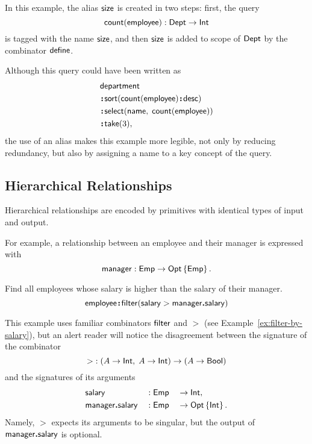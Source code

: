 In this example, the alias $\textup{\textsf{size}}$ is created in two steps: first, the query
\begin{equation*}
    \textup{\textsf{count}}(\textup{\textsf{employee}}): \textup{\textsf{Dept}} \to \textup{\textsf{Int}}
\end{equation*}
is tagged with the name $\textup{\textsf{size}}$, and then $\textup{\textsf{size}}$ is added to scope of $\textup{\textsf{Dept}}$
by the combinator $\textup{\textsf{define}}$.

Although this query could have been written as
\begin{align*}
    & \Department \\
    & \Apply\Sort(\Count(\Employee)\Apply\Desc) \\
    & \Apply\Select(\Name,\; \Count(\Employee)) \\
    & \Apply\Take(3),
\end{align*}
the use of an alias makes this example more legible, not only by reducing
redundancy, but also by assigning a name to a key concept of the query.

\subsection*{Hierarchical Relationships}

Hierarchical relationships are encoded by primitives with identical types of
input and output.

For example, a relationship between an employee and their manager is expressed
with
\begin{equation*}
    \textup{\textsf{manager}} : \textup{\textsf{Emp}} \to \textup{\textsf{Opt}}\left\{\textup{\textsf{Emp}}\right\}.
\end{equation*}

\begin{demo}
    \label{ex:employee-filter-salary-manager}
    Find all employees whose salary is higher than the salary of their manager.
    \begin{equation*}
        \textup{\textsf{employee}}\!\boldsymbol{:}\!\textup{\textsf{filter}}(\textup{\textsf{salary}}>\textup{\textsf{manager}}\boldsymbol{.}\textup{\textsf{salary}})
    \end{equation*}
\end{demo}

This example uses familiar combinators $\textup{\textsf{filter}}$ and ${>}$ (see
Example~\ref{ex:filter-by-salary}), but an alert reader will notice the
disagreement between the signature of the combinator
\begin{equation*}
    {>} : (A \to \textup{\textsf{Int}},\; A \to \textup{\textsf{Int}}) \to (A \to \textup{\textsf{Bool}})
\end{equation*}
and the signatures of its arguments
\begin{alignat*}{3}
    & \textup{\textsf{salary}} && : \textup{\textsf{Emp}} && \to \textup{\textsf{Int}}, \\
    & \textup{\textsf{manager}}\boldsymbol{.}\textup{\textsf{salary}} && : \textup{\textsf{Emp}} && \to \textup{\textsf{Opt}}\left\{\textup{\textsf{Int}}\right\}.
\end{alignat*}
Namely, ${>}$ expects its arguments to be singular, but the output of
$\textup{\textsf{manager}}\boldsymbol{.}\textup{\textsf{salary}}$ is optional.

